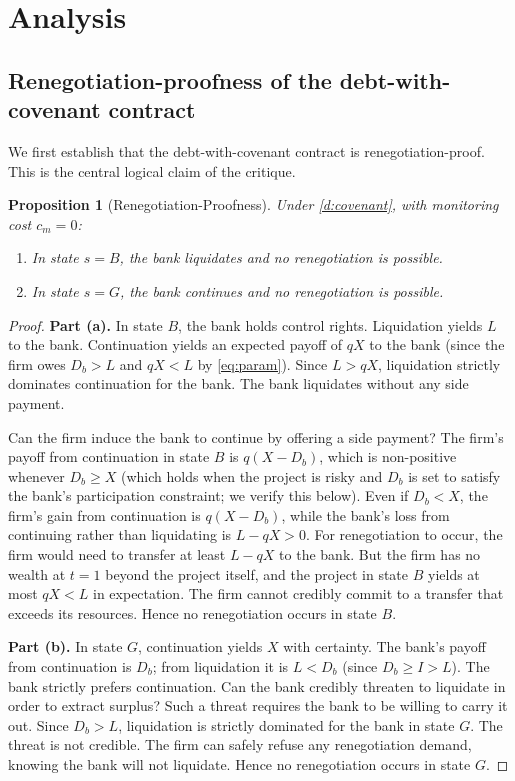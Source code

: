 \documentclass[12pt,a4paper]{article}
\theoremstyle{plain}
\newtheorem{proposition}[theorem]{Proposition}
\theoremstyle{definition}
\theoremstyle{remark}
\begin{document}
\section{Analysis}
\label{sec:analysis}

\subsection{Renegotiation-proofness of the debt-with-covenant contract}
\label{sec:renegotiation}

We first establish that the debt-with-covenant contract is renegotiation-proof. This is the central logical claim of the critique.

\begin{proposition}[Renegotiation-Proofness]
\label{p:renegotiation-proof}
Under \cref{d:covenant}, with monitoring cost $c_m = 0$:
\begin{enumerate}[nosep,label=(\alph*)]
\item In state $s = B$, the bank liquidates and no renegotiation is possible.
\item In state $s = G$, the bank continues and no renegotiation is possible.
\end{enumerate}
\end{proposition}

\begin{proof}
\textbf{Part (a).} In state $B$, the bank holds control rights. Liquidation yields $L$ to the bank. Continuation yields an expected payoff of $qX$ to the bank (since the firm owes $D_b > L$ and $qX < L$ by \cref{eq:param}). Since $L > qX$, liquidation strictly dominates continuation for the bank. The bank liquidates without any side payment.

Can the firm induce the bank to continue by offering a side payment? The firm's payoff from continuation in state $B$ is $q(X - D_b)$, which is non-positive whenever $D_b \geq X$ (which holds when the project is risky and $D_b$ is set to satisfy the bank's participation constraint; we verify this below). Even if $D_b < X$, the firm's gain from continuation is $q(X - D_b)$, while the bank's loss from continuing rather than liquidating is $L - qX > 0$. For renegotiation to occur, the firm would need to transfer at least $L - qX$ to the bank. But the firm has no wealth at $t = 1$ beyond the project itself, and the project in state $B$ yields at most $qX < L$ in expectation. The firm cannot credibly commit to a transfer that exceeds its resources. Hence no renegotiation occurs in state $B$.

\textbf{Part (b).} In state $G$, continuation yields $X$ with certainty. The bank's payoff from continuation is $D_b$; from liquidation it is $L < D_b$ (since $D_b \geq I > L$). The bank strictly prefers continuation. Can the bank credibly threaten to liquidate in order to extract surplus? Such a threat requires the bank to be willing to carry it out. Since $D_b > L$, liquidation is strictly dominated for the bank in state $G$. The threat is not credible. The firm can safely refuse any renegotiation demand, knowing the bank will not liquidate. Hence no renegotiation occurs in state $G$.
\end{proof}
\end{document}
